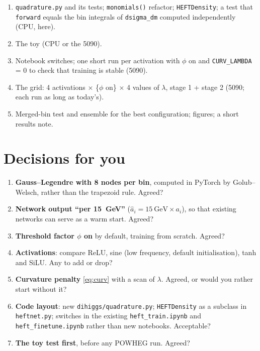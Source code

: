 \documentclass[11pt]{article}
\newcommand{\file}[1]{\nolinkurl{#1}}
\newcommand{\code}[1]{\texttt{#1}}
\begin{document}
\begin{enumerate}
  \item \file{quadrature.py} and its tests; \code{monomials()} refactor; \code{HEFTDensity}; a test that
    \code{forward} equals the bin integrals of \code{dsigma\_dm} computed independently (CPU, here).
  \item The toy (CPU or the 5090).
  \item Notebook switches; one short run per activation with $\phi$ on and \code{CURV\_LAMBDA} = 0
    to check that training is stable (5090).
  \item The grid: 4 activations $\times$ \{$\phi$ on\} $\times$ 4 values of $\lambda$, stage 1 + stage 2
    (5090; each run as long as today's).
  \item Merged-bin test and ensemble for the best configuration; figures; a short results note.
\end{enumerate}

\section{Decisions for you}
\label{sec:decisions}

\begin{keyidea}
\begin{enumerate}
  \item \textbf{Gauss--Legendre with 8 nodes per bin}, computed in PyTorch by Golub--Welsch,
    rather than the trapezoid rule. Agreed?
  \item \textbf{Network output ``per 15~GeV''} ($\hat a_i = 15~\text{GeV}\times a_i$), so that
    existing networks can serve as a warm start. Agreed?
  \item \textbf{Threshold factor $\phi$ on} by default, training from scratch. Agreed?
  \item \textbf{Activations}: compare ReLU, sine (low frequency, default initialisation), tanh and
    SiLU. Any to add or drop?
  \item \textbf{Curvature penalty} \cref{eq:curv} with a scan of $\lambda$. Agreed, or would you
    rather start without it?
  \item \textbf{Code layout}: new \file{dihiggs/quadrature.py}; \code{HEFTDensity} as a subclass in
    \file{heftnet.py}; switches in the existing \file{heft_train.ipynb} and
    \file{heft_finetune.ipynb} rather than new notebooks. Acceptable?
  \item \textbf{The toy test first}, before any POWHEG run. Agreed?
\end{enumerate}
\end{keyidea}
\end{document}
